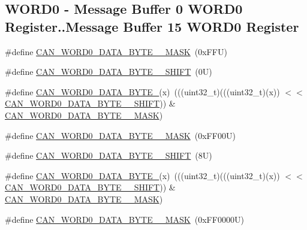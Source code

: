 \subsection*{W\+O\+R\+D0 -\/ Message Buffer 0 W\+O\+R\+D0 Register..Message Buffer 15 W\+O\+R\+D0 Register}
\begin{DoxyCompactItemize}
\item 
\#define \mbox{\hyperlink{group___c_a_n___register___masks_ga2b8efb33402c5777d3d7b40c0c84eaac}{C\+A\+N\+\_\+\+W\+O\+R\+D0\+\_\+\+D\+A\+T\+A\+\_\+\+B\+Y\+T\+E\+\_\+\_\+\+M\+A\+SK}}~(0x\+F\+F\+U)
\item 
\#define \mbox{\hyperlink{group___c_a_n___register___masks_ga3835334fa3df07e17141619f9bdb33df}{C\+A\+N\+\_\+\+W\+O\+R\+D0\+\_\+\+D\+A\+T\+A\+\_\+\+B\+Y\+T\+E\+\_\+\_\+\+S\+H\+I\+FT}}~(0\+U)
\item 
\#define \mbox{\hyperlink{group___c_a_n___register___masks_ga6003475760ed870fa3edaa34a75f2170}{C\+A\+N\+\_\+\+W\+O\+R\+D0\+\_\+\+D\+A\+T\+A\+\_\+\+B\+Y\+T\+E\+\_}}(x)~(((uint32\+\_\+t)(((uint32\+\_\+t)(x)) $<$$<$ \mbox{\hyperlink{group___c_a_n___register___masks_ga3835334fa3df07e17141619f9bdb33df}{C\+A\+N\+\_\+\+W\+O\+R\+D0\+\_\+\+D\+A\+T\+A\+\_\+\+B\+Y\+T\+E\+\_\+\_\+\+S\+H\+I\+FT}})) \& \mbox{\hyperlink{group___c_a_n___register___masks_ga2b8efb33402c5777d3d7b40c0c84eaac}{C\+A\+N\+\_\+\+W\+O\+R\+D0\+\_\+\+D\+A\+T\+A\+\_\+\+B\+Y\+T\+E\+\_\+\_\+\+M\+A\+SK}})
\item 
\#define \mbox{\hyperlink{group___c_a_n___register___masks_gaf5ac3a0da0156c6c331ae39e688d1a6b}{C\+A\+N\+\_\+\+W\+O\+R\+D0\+\_\+\+D\+A\+T\+A\+\_\+\+B\+Y\+T\+E\+\_\+\_\+\+M\+A\+SK}}~(0x\+F\+F00\+U)
\item 
\#define \mbox{\hyperlink{group___c_a_n___register___masks_ga30489eaec721b5f42b721c65d8c0cf67}{C\+A\+N\+\_\+\+W\+O\+R\+D0\+\_\+\+D\+A\+T\+A\+\_\+\+B\+Y\+T\+E\+\_\+\_\+\+S\+H\+I\+FT}}~(8\+U)
\item 
\#define \mbox{\hyperlink{group___c_a_n___register___masks_ga091cd1ebb0220a7f7aae9c78ee77d195}{C\+A\+N\+\_\+\+W\+O\+R\+D0\+\_\+\+D\+A\+T\+A\+\_\+\+B\+Y\+T\+E\+\_}}(x)~(((uint32\+\_\+t)(((uint32\+\_\+t)(x)) $<$$<$ \mbox{\hyperlink{group___c_a_n___register___masks_ga30489eaec721b5f42b721c65d8c0cf67}{C\+A\+N\+\_\+\+W\+O\+R\+D0\+\_\+\+D\+A\+T\+A\+\_\+\+B\+Y\+T\+E\+\_\+\_\+\+S\+H\+I\+FT}})) \& \mbox{\hyperlink{group___c_a_n___register___masks_gaf5ac3a0da0156c6c331ae39e688d1a6b}{C\+A\+N\+\_\+\+W\+O\+R\+D0\+\_\+\+D\+A\+T\+A\+\_\+\+B\+Y\+T\+E\+\_\+\_\+\+M\+A\+SK}})
\item 
\#define \mbox{\hyperlink{group___c_a_n___register___masks_ga9e7f294cbdc5772dc2de56ec615eb695}{C\+A\+N\+\_\+\+W\+O\+R\+D0\+\_\+\+D\+A\+T\+A\+\_\+\+B\+Y\+T\+E\+\_\+\_\+\+M\+A\+SK}}~(0x\+F\+F0000\+U)

\end{DoxyCompactItemize}
